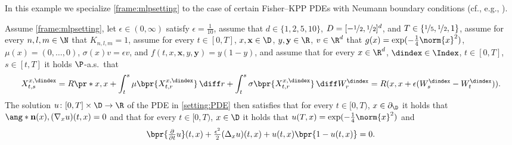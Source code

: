 \begin{example}
	\label{exampleMLP:fisherkpp_neumann}
	In this example we specialize \cref{frame:mlpsetting} to the case of certain Fisher--KPP PDEs with Neumann boundary conditions (cf., e.g., \citep{Bian2017,Wang2021}).
	
	Assume 
		\cref{frame:mlpsetting},
	let
		$\epsilon\in(0,\infty)$
	satisfy
		$\epsilon = \tfrac{1}{10}$,
	assume that
		$d\in\{1,2,5,10\}$,
		$D = [-\nicefrac{1}{2},\nicefrac{1}{2}]^d$, and
		$T\in\{\nicefrac{1}{5},\nicefrac{1}{2},1\}$,
	assume 
		for every 
			$n,l,m\in \N$ 
		that
			$K_{n,l,m} = 1$,
	assume for every 
		$t \in [0,T]$,
		$x,\mathbf{x} \in \D$,
		$y,\mathbf{y} \in \R$,
		$v \in \R^d$ 
	that
		$g(x)= \exp (- \tfrac{1}{4}\norm{x}^2)$,
		$\mu(x)=(0,\dots,0)$, 
		$\sigma(x) v = \epsilon v$, and
		$f(t,x,\mathbf{x},y,\mathbf{y})= y(1-y)$,
	and	assume that for every 
		$x\in \R^{d}$, 
		$\dindex \in \Index$, 
		$t\in [0,T]$, 
		$s\in [t,T]$ 
	it holds $\P$-a.s.\ that
	\begin{equation}
		X^{x,\dindex}_{t,s} 
		= 
		R\pr*{x,x + \int_{t}^{s} \mu\bpr{X^{x,\dindex}_{t,r}} \, \diff r + \int^{s}_{t} \sigma \bpr{X^{x,\dindex}_{t,r}} \, \diff W^{\dindex}_{r} }
		=
		R(x,x+\epsilon(W^\dindex_s-W^\dindex_t))
		.
	\end{equation}
	The solution 
		$u\colon[0,T]\times \D \to \R$ 
	of the PDE in \eqref{setting:PDE} then satisfies that 
		for every
			$t\in [0,T)$, $x\in\partial_\D$
		it holds that
			$\ang*{\mathbf{n}(x) ,(\nabla_x u)(t,x)} = 0$
		and that for every
			$t\in [0,T)$, $x\in\D$
		it holds that
			$u(T,x) = \exp (- \tfrac{1}{4}\norm{x}^2)$ and
			\begin{equation}
				\label{eqMLP:fisherKPP_neumann}
				\bpr{\tfrac{\partial }{\partial t}u} (t,x) 
				+
				\tfrac{\epsilon^2}{2}(\Delta_x u) (t,x) 
				+
				u(t,x)\bpr{1 - u(t,x) }
				=
				0
				.
			\end{equation}
\end{example}


